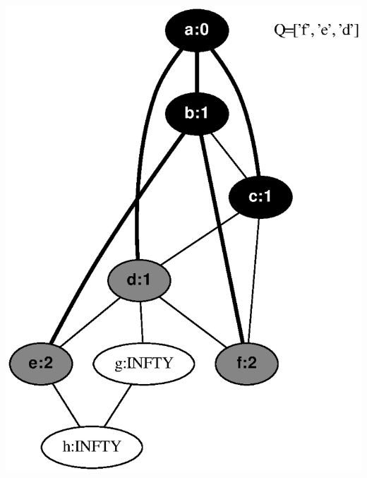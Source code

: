 \documentclass{article}
\begin{document}
\includegraphics[height=.3\textheight]{bfs_undirected_classroom_key_03.eps}
\vspace{1em}
\end{document}
